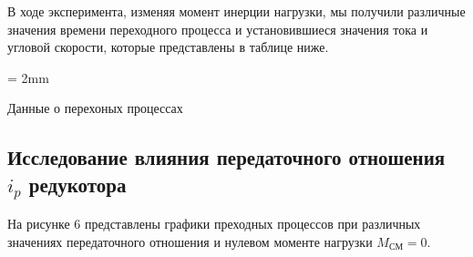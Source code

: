 \documentclass[a4paper, 12pt]{article}
\begin{document}
В ходе эксперимента, изменяя момент инерции нагрузки, мы получили различные значения времени переходного процесса и установившиеся значения тока и угловой скорости, которые представлены в таблице ниже.

\begin{table}[h!]
	\tabulinesep = 2mm
	\centering
   \begin{threeparttable}
        \caption{Данные о перехоных процессах }
    \end{threeparttable}
\end{table}

\newpage
\begin{center}
\section{Исследование влияния передаточного отношения $i_p$ редукотора}
\end{center}
\par На рисунке 6 представлены графики преходных процессов при различных значениях передаточного отношения и нулевом моменте нагрузки $M_\text{СМ} = 0$.
\end{document}

